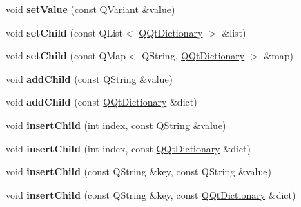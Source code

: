 \begin{DoxyCompactItemize}
\item 
\mbox{\label{class_q_qt_dictionary_a0d2d5bfc2daf699e7b1b141a982c6663}} 
void {\bfseries set\+Value} (const Q\+Variant \&value)
\item 
\mbox{\label{class_q_qt_dictionary_a4da6fd97e86cd804a3fa3b4d380ee029}} 
void {\bfseries set\+Child} (const Q\+List$<$ \mbox{\hyperlink{class_q_qt_dictionary}{Q\+Qt\+Dictionary}} $>$ \&list)
\item 
\mbox{\label{class_q_qt_dictionary_acf6d749acdb47dfa2f4ccc4a724b5353}} 
void {\bfseries set\+Child} (const Q\+Map$<$ Q\+String, \mbox{\hyperlink{class_q_qt_dictionary}{Q\+Qt\+Dictionary}} $>$ \&map)
\item 
\mbox{\label{class_q_qt_dictionary_a7da621e7fd07ac8d39aaee37ebbf03b1}} 
void {\bfseries add\+Child} (const Q\+String \&value)
\item 
\mbox{\label{class_q_qt_dictionary_a2eec41827066a649efa56e1fad7166c7}} 
void {\bfseries add\+Child} (const \mbox{\hyperlink{class_q_qt_dictionary}{Q\+Qt\+Dictionary}} \&dict)
\item 
\mbox{\label{class_q_qt_dictionary_ab57815be9a511eaf550fe99ce844f238}} 
void {\bfseries insert\+Child} (int index, const Q\+String \&value)
\item 
\mbox{\label{class_q_qt_dictionary_ad7a12dd1a7d3cd833393257905a2d48e}} 
void {\bfseries insert\+Child} (int index, const \mbox{\hyperlink{class_q_qt_dictionary}{Q\+Qt\+Dictionary}} \&dict)
\item 
\mbox{\label{class_q_qt_dictionary_a5fe64418ab4d7a2470b64afcdf22538e}} 
void {\bfseries insert\+Child} (const Q\+String \&key, const Q\+String \&value)
\item 
\mbox{\label{class_q_qt_dictionary_a58e8cc1f08e8e152faa1db45ee2d1269}} 
void {\bfseries insert\+Child} (const Q\+String \&key, const \mbox{\hyperlink{class_q_qt_dictionary}{Q\+Qt\+Dictionary}} \&dict)
\item 
\mbox{\label{class_q_qt_dictionary_a7ebadc66f8ddb6f745822565a7866c4f}} 

\end{DoxyCompactItemize}
